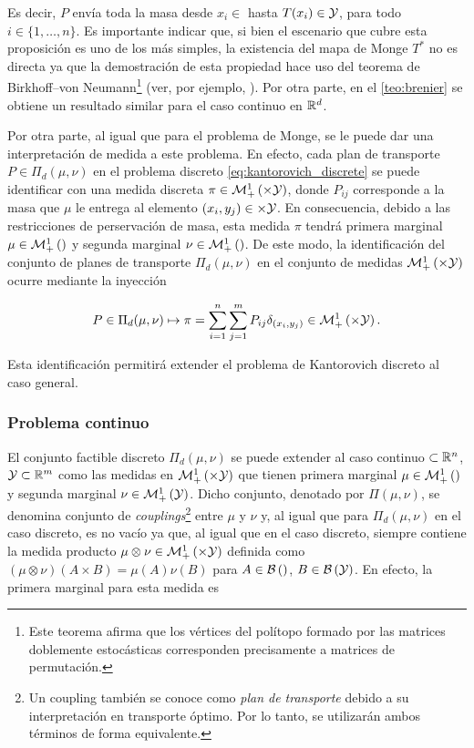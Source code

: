 Es decir, $P$ envía toda la masa desde $x_i\in\xspace$ hasta $T(x_i)\in\mathcal{Y}$, para todo $i\in\{1,\ldots,n\}$. Es importante indicar que, si bien el escenario que cubre esta proposición es uno de los más simples, la existencia del mapa de Monge $T^*$ no es directa ya que la demostración de esta propiedad hace uso del teorema de Birkhoff–von Neumann\footnote{Este teorema afirma que los vértices del polítopo formado por las matrices doblemente estocásticas corresponden precisamente a matrices de permutación.} (ver, por ejemplo, \cite{Thorpe2018}). Por otra parte, en el \autoref{teo:brenier} se obtiene un resultado similar para el caso continuo en $\mathbb{R}^d$.

Por otra parte, al igual que para el problema de Monge, se le puede dar una interpretación de medida a este problema. En efecto, cada plan de transporte $P\in\Pi_d(\mu,\nu)$ en el problema discreto \eqref{eq:kantorovich_discrete} se puede identificar con una medida discreta $\pi\in\probmeasure{\xspace\times\yspace}$, donde $P_{ij}$ corresponde a la masa que $\mu$ le entrega al elemento $(x_i,y_j)\in\times\mathcal{Y}$. En consecuencia, debido a las restricciones de perservación de masa, esta medida $\pi$ tendrá primera marginal $\mu\in\mathcal{M}_+^1\left(\right)$ y segunda marginal $\nu\in\mathcal{M}_+^1\left(\right)$. De este modo, la identificación del conjunto de planes de transporte $\Pi_d(\mu,\nu)$ en el conjunto de medidas $\probmeasure{\xspace\times\yspace}$ ocurre mediante la inyección

\begin{equation}
	\label{eq:coupling_identification}
	P\in\Pi_d(\mu,\nu)\mapsto \pi = \sum_{i=1}^{n}\sum_{j=1}^{m} P_{ij}\delta_{(x_i, y_j)} \in\probmeasure{\xspace\times\yspace}.
\end{equation}

Esta identificación permitirá extender el problema de Kantorovich discreto al caso general.

\subsubsection{Problema continuo}

El conjunto factible discreto $\Pi_d(\mu,\nu)$ se puede extender al caso continuo $\subset\mathbb{R}^n$, $\mathcal{Y}\subset\mathbb{R}^m$ como las medidas en $\probmeasure{\xspace\times\yspace}$ que tienen primera marginal $\mu\in\mathcal{M}_+^1\left(\right)$ y segunda marginal $\nu\in\mathcal{M}_+^1\left(\mathcal{Y}\right)$. Dicho conjunto, denotado por $\Pi(\mu,\nu)$, se denomina conjunto de \textit{couplings}\footnote{Un coupling también se conoce como \textit{plan de transporte} debido a su interpretación en transporte óptimo. Por lo tanto, se utilizarán ambos términos de forma equivalente.} entre $\mu$ y $\nu$ y, al igual que para $\Pi_d(\mu,\nu)$ en el caso discreto, es no vacío ya que, al igual que en el caso discreto, siempre contiene la medida producto $\mu\otimes\nu\in\probmeasure{\xspace\times\yspace}$ definida como $(\mu\otimes\nu)(A\times B)=\mu(A)\nu(B)$ para $A\in\mathcal{B}\left(\right)$, $B\in\mathcal{B}\left(\mathcal{Y}\right)$. En efecto, la primera marginal para esta medida es

